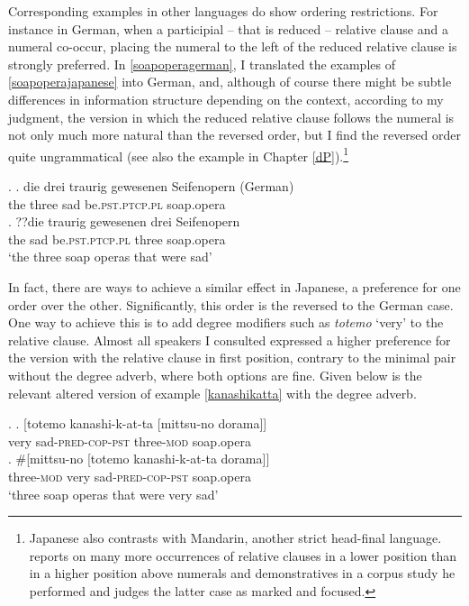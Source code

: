 \documentclass [output=book,colorlinks,citecolor=brown]{langscibook}
\begin{document}
Corresponding examples in other languages do show ordering restrictions. For instance in German, when a participial -- that is reduced -- relative clause and a numeral co-occur, placing the numeral to the left of the reduced relative clause is strongly preferred. In \ref{soapoperagerman}, I translated the examples of \ref{soapoperajapanese} into German, and, although of course there might be subtle differences in information structure depending on the context, according to my judgment, the version in which the reduced relative clause follows the numeral is not only much more natural than the reversed order, but I find the reversed order quite ungrammatical (see also the example in Chapter \ref{dP}).\footnote{Japanese also contrasts with Mandarin, another strict head-final language. \citet{hsu:2017:alternatives} reports on many more occurrences of relative clauses in a lower position than in a higher position above numerals and demonstratives in a corpus study he performed and judges the latter case as marked and focused.} %

\ex. \ag. die drei traurig gewesenen Seifenopern (German)\\
the three sad be.\textsc{pst.ptcp.pl} soap.opera\\
\bg. ??die traurig gewesenen drei Seifenopern \\
the sad be.\textsc{pst.ptcp.pl} three soap.opera\\
`the three soap operas that were sad' \label{soapoperagerman}

In fact, there are ways to achieve a similar effect in Japanese, a preference for one order over the other. Significantly, this order is the reversed to the German case. One way to achieve this is to add degree modifiers such as \textit{totemo} `very’ to the relative clause. Almost all speakers I consulted expressed a higher preference for the version with the relative clause in first position, contrary to the minimal pair without the degree adverb, where both options are fine. Given below is the relevant altered version of example \ref{kanashikatta} with the degree adverb. %

\newpage

\ex. \label{dorama} \ag. [totemo kanashi-k-at-ta [mittsu-no dorama]]\\
very sad-\textsc{pred-cop-pst} three-\textsc{mod} soap.opera\\
\bg. \#[mittsu-no [totemo kanashi-k-at-ta dorama]]\\
three-\textsc{mod} very sad-\textsc{pred-cop-pst} soap.opera\\
`three soap operas that were very sad'
\end{document}
